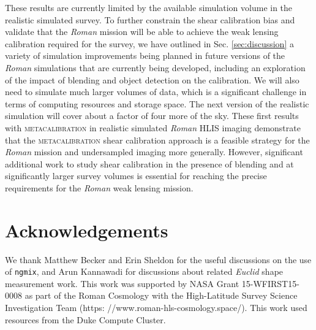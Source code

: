 \documentclass[fleqn,usenatbib]{mnras}
\begin{document}
These results are currently limited by the available simulation volume in the realistic simulated survey. To further constrain the shear calibration bias and validate that the \emph{Roman} mission will be able to achieve the weak lensing calibration required for the survey, we have outlined in Sec. \ref{sec:discussion} a variety of simulation improvements being planned in future versions of the \emph{Roman} simulations that are currently being developed, including an exploration of the impact of blending and object detection on the calibration. We will also need to simulate much larger volumes of data, which is a significant challenge in terms of computing resources and storage space. The next version of the realistic simulation will cover about a factor of four more of the sky. These first results with \textsc{metacalibration} in realistic simulated \emph{Roman} HLIS imaging demonstrate that the \textsc{metacalibration} shear calibration approach is a feasible strategy for the \emph{Roman} mission and undersampled imaging more generally. However, significant additional work to study shear calibration in the presence of blending and at significantly larger survey volumes is essential for reaching the precise requirements for the \emph{Roman} weak lensing mission. 



\section{Acknowledgements}

We thank Matthew Becker and Erin Sheldon for the useful discussions on the use of \texttt{ngmix}, and Arun Kannawadi for discussions about related \emph{Euclid} shape measurement work. This work was supported by NASA Grant 15-WFIRST15-0008 as part of the Roman Cosmology with the High-Latitude Survey Science Investigation Team (https: //www.roman-hls-cosmology.space/). This work used resources from the Duke Compute Cluster.


 
\end{document}
